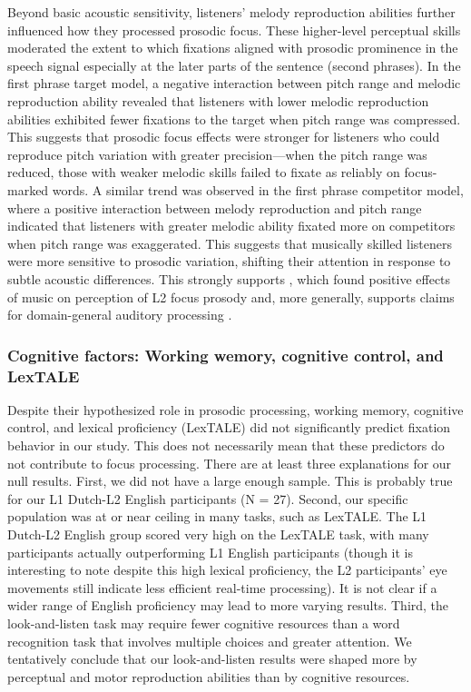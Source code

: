 Beyond basic acoustic sensitivity, listeners’ melody reproduction abilities further influenced how they processed prosodic focus. These higher-level perceptual skills moderated the extent to which fixations aligned with prosodic prominence in the speech signal especially at the later parts of the sentence (second phrases). In the first phrase target model, a negative interaction between pitch range and melodic reproduction ability revealed that listeners with lower melodic reproduction abilities exhibited fewer fixations to the target when pitch range was compressed. This suggests that prosodic focus effects were stronger for listeners who could reproduce pitch variation with greater precision—when the pitch range was reduced, those with weaker melodic skills failed to fixate as reliably on focus-marked words. A similar trend was observed in the first phrase competitor model, where a positive interaction between melody reproduction and pitch range indicated that listeners with greater melodic ability fixated more on competitors when pitch range was exaggerated. This suggests that musically skilled listeners were more sensitive to prosodic variation, shifting their attention in response to subtle acoustic differences. This strongly supports \cite{jansen2023influence}, which found positive effects of music on perception of L2 focus prosody and, more generally, supports claims for domain-general auditory processing \parencite{saito2022does, bramlett_wiener_24_speechprosody, bakkouche2025effects, Kachlicka_Saito_Tierney_2019}.


\subsubsection{Cognitive factors: Working wemory, cognitive control, and LexTALE}

Despite their hypothesized role in prosodic processing, working memory, cognitive control, and lexical proficiency (LexTALE) did not significantly predict fixation behavior in our study. This does not necessarily mean that these predictors do not contribute to focus processing. There are at least three explanations for our null results. First, we did not have a large enough sample. This is probably true for our L1 Dutch-L2 English participants (N = 27). Second, our specific population was at or near ceiling in many tasks, such as LexTALE. The L1 Dutch-L2 English group scored very high on the LexTALE task, with many participants actually outperforming L1 English participants (though it is interesting to note despite this high lexical proficiency, the L2 participants' eye movements still indicate less efficient real-time processing). It is not clear if a wider range of English proficiency may lead to more varying results. Third, the look-and-listen task may require fewer cognitive resources than a word recognition task that involves multiple choices and greater attention. We tentatively conclude that our look-and-listen results were shaped more by perceptual and motor reproduction abilities than by cognitive resources.


